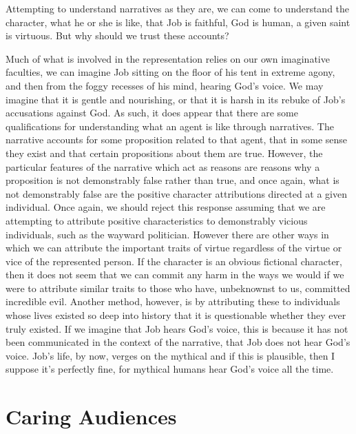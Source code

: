 \documentclass[12pt]{book}
\theoremstyle{definition}
\theoremstyle{remark}
\begin{document}
Attempting to understand narratives as they are, we can come to understand the character, what he or she is like, that Job is faithful, God is human, a given saint is virtuous. But why should we trust these accounts?

Much of what is involved in the representation relies on our own imaginative faculties, we can imagine Job sitting on the floor of his tent in extreme agony, and then from the foggy recesses of his mind, hearing God's voice. We may imagine that it is gentle and nourishing, or that it is harsh in its rebuke of Job's accusations against God. As such, it does appear that there are some qualifications for understanding what an agent is like through narratives. The narrative accounts for some proposition related to that agent, that in some sense they exist and that certain propositions about them are true. However, the particular features of the narrative which act as reasons are reasons why a proposition is not demonstrably false rather than true, and once again, what is not demonstrably false are the positive character attributions directed at a given individual. Once again, we should reject this response assuming that we are attempting to attribute positive characteristics to demonstrably vicious individuals, such as the wayward politician. However there are other ways in which we can attribute the important traits of virtue regardless of the virtue or vice of the represented person. If the character is an obvious fictional character, then it does not seem that we can commit any harm in the ways we would if we were to attribute similar traits to those who have, unbeknownst to us, committed incredible evil. Another method, however, is by attributing these to individuals whose lives existed so deep into history that it is questionable whether they ever truly existed. If we imagine that Job hears God's voice, this is because it has not been communicated in the context of the narrative, that Job does not hear God's voice. Job's life, by now, verges on the mythical and if this is plausible, then I suppose it's perfectly fine, for mythical humans hear God's voice all the time.

\section{Caring Audiences}\label{caring-audiences}
\end{document}

